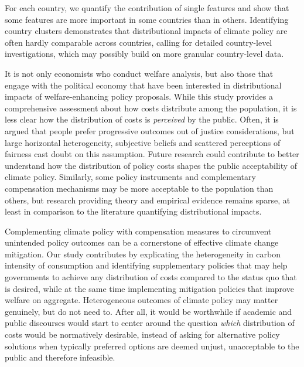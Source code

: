 \documentclass[12pt, a4paper]{article}
\begin{document}
For each country, we quantify the contribution of single features and show that some features are more important in some countries than in others. Identifying country clusters demonstrates that distributional impacts of climate policy are often hardly comparable across countries, calling for detailed country-level investigations, which may possibly build on more granular country-level data.

It is not only economists who conduct welfare analysis, but also those that engage with the political economy that have been interested in distributional impacts of welfare-enhancing policy proposals. While this study provides a comprehensive assessment about how costs distribute among the population, it is less clear how the distribution of costs is \textit{perceived} by the public. Often, it is argued that people prefer progressive outcomes out of justice considerations, but large horizontal heterogeneity, subjective beliefs \autocite{Douenne.2022} and scattered perceptions of fairness \autocite{MaestreAndres.2019,Povitkina.2021} cast doubt on this assumption. Future research could contribute to better understand how the distribution of policy costs shapes the public acceptability of climate policy. Similarly, some policy instruments and complementary compensation mechanisms may be more acceptable to the population than others, but research providing theory and empirical evidence remains sparse, at least in comparison to the literature quantifying distributional impacts. 

Complementing climate policy with compensation measures to circumvent unintended policy outcomes can be a cornerstone of effective climate change mitigation. Our study contributes by explicating the heterogeneity in carbon intensity of consumption and identifying supplementary policies that may help governments to achieve any distribution of costs compared to the status quo that is desired, while at the same time implementing mitigation policies that improve welfare on aggregate. Heterogeneous outcomes of climate policy may matter genuinely, but do not need to. After all, it would be worthwhile if academic and public discourses would start to center around the question \textit{which} distribution of costs would be normatively desirable, instead of asking for alternative policy solutions when typically preferred options are deemed unjust, unacceptable to the public and therefore infeasible. 
\end{document}
